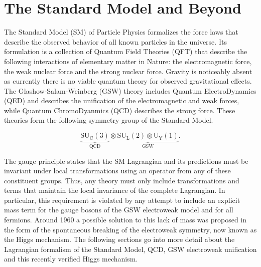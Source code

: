 \chapter{The Standard Model and Beyond} \label{chap:standard_model}

The Standard Model (SM) of Particle Physics formalizes the force laws that
describe the observed behavior of all known particles in the universe. Its
formulation is a collection of Quantum Field Theories (QFT) that describe the
following interactions of elementary matter in Nature: the electromagnetic
force, the weak nuclear force and the strong nuclear force.  Gravity is
noticeably absent as currently there is no viable quantum theory for observed
gravitational effects.  The Glashow-Salam-Weinberg (GSW) \cite{Glashow:1961tr,
Goldstone:1962es, Weinberg:1967tq} theory includes Quantum ElectroDynamics
(QED) and describes the unification of the electromagnetic and weak forces,
while Quantum ChromoDyanmics (QCD) \cite{Campbell:2017hsr} describes the strong
force.  These theories form the following symmetry group of the Standard Model.

\begin{equation} \label{eq:standardmodel:symmetry_group}
  \underbrace{\text{SU}_\text{C}(3)}_\text{QCD} \otimes
\underbrace{\text{SU}_\text{L}(2) \otimes \text{U}_\text{Y}(1)}_\text{GSW}.
\end{equation}

The gauge principle states that the SM Lagrangian and its predictions must be
invariant under local transformations using an operator from any of these
constituent groups.  Thus, any theory must only include transformations and
terms that maintain the local invariance of the complete Lagrangian.  In
particular, this requirement is violated by any attempt to include an explicit
mass term for the gauge bosons of the GSW electroweak model and for all
fermions.  Around 1960 a possible solution to this lack of mass was proposed in
the form of the spontaneous breaking of the electroweak symmetry, now known as
the Higgs mechanism.  The following sections go into more detail about the
Lagrangian formalism of the Standard Model, QCD, GSW electroweak unification
and this recently verified Higgs mechanism.





